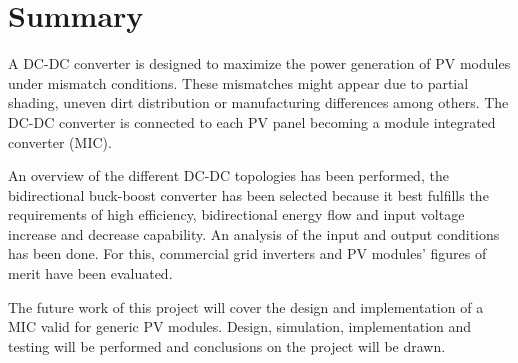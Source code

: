 \chapter*{Summary}


A DC-DC converter is designed to maximize the power generation of PV modules under mismatch conditions. These mismatches might appear due to partial shading, uneven dirt distribution or manufacturing differences among others. The DC-DC converter is connected to each PV panel becoming a module integrated converter (MIC).


An overview of the different DC-DC topologies has been performed, the bidirectional buck-boost converter has been selected because it best fulfills the requirements of high efficiency, bidirectional energy flow and input voltage increase and decrease capability. An analysis of the input and output conditions has been done. For this, commercial grid inverters and PV modules' figures of merit have been evaluated.


The future work of this project will cover the design and implementation of a MIC valid for generic PV modules. Design, simulation, implementation and testing will be performed and conclusions on the project will be drawn.
